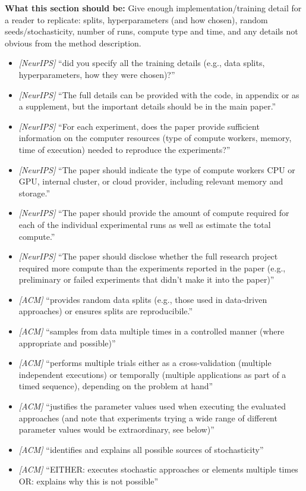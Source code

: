 \noindent\textbf{What this section should be:}
Give enough implementation/training detail for a reader to replicate: splits, hyperparameters (and how chosen), random seeds/stochasticity, number of runs, compute type and time, and any details not obvious from the method description.
\begin{itemize}
  \item \textit{[NeurIPS]} ``did you specify all the training details (e.g., data splits, hyperparameters, how they were chosen)?''
  \item \textit{[NeurIPS]} ``The full details can be provided with the code, in appendix or as a supplement, but the important details should be in the main paper.''
  \item \textit{[NeurIPS]} ``For each experiment, does the paper provide sufficient information on the computer resources (type of compute workers, memory, time of execution) needed to reproduce the experiments?''
  \item \textit{[NeurIPS]} ``The paper should indicate the type of compute workers CPU or GPU, internal cluster, or cloud provider, including relevant memory and storage.''
  \item \textit{[NeurIPS]} ``The paper should provide the amount of compute required for each of the individual experimental runs as well as estimate the total compute.''
  \item \textit{[NeurIPS]} ``The paper should disclose whether the full research project required more compute than the experiments reported in the paper (e.g., preliminary or failed experiments that didn’t make it into the paper)''
  \item \textit{[ACM]} ``provides random data splits (e.g., those used in data-driven approaches) or ensures splits are reproducibile.''
  \item \textit{[ACM]} ``samples from data multiple times in a controlled manner (where appropriate and possible)''
  \item \textit{[ACM]} ``performs multiple trials either as a cross-validation (multiple independent executions) or temporally (multiple applications as part of a timed sequence), depending on the problem at hand''
  \item \textit{[ACM]} ``justifies the parameter values used when executing the evaluated approaches (and note that experiments trying a wide range of different parameter values would be extraordinary, see below)''
  \item \textit{[ACM]} ``identifies and explains all possible sources of stochasticity''
  \item \textit{[ACM]} ``EITHER: executes stochastic approaches or elements multiple times OR: explains why this is not possible''
\end{itemize}